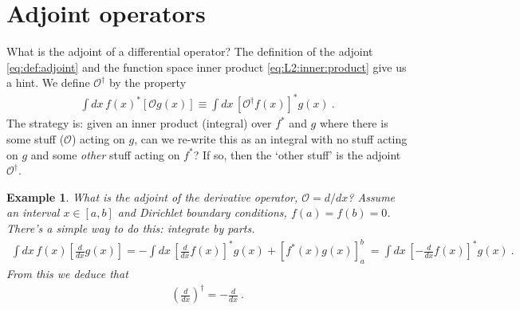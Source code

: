 \documentclass[
  11pt,
	colorful,
	raggedright,
]{tufte-style-thesis-flip}
\newtheorem{example}{Example}[section]
\begin{document}
\section{Adjoint operators}

What is the adjoint of a differential operator? The definition of the adjoint \eqref{eq:def:adjoint} and the function space inner product \eqref{eq:L2:inner:product} give us a hint. We define $\mathcal O^\dag$ by the property
\begin{align}
  \int dx \, f(x)^* \left[\mathcal O g(x)\right]
  \equiv
  \int dx \, \left[\mathcal O^\dag f(x)\right]^*  g(x) \ .
\end{align}
The strategy is: given an inner product (integral) over $f^*$ and $g$ where there is some stuff ($\mathcal O$) acting on $g$, can we re-write this as an integral with no stuff acting on $g$ and some \emph{other} stuff acting on $f^*$? If so, then the `other stuff' is the adjoint $\mathcal O^\dag$.
\begin{example}
What is the adjoint of the derivative operator, $\mathcal O = d/dx$? Assume an interval $x\in[a,b]$ and Dirichlet boundary conditions, $f(a)=f(b)=0$. There's a simple way to do this: integrate by parts.
\begin{align}
  \int dx \,  f(x) \left[\frac{d}{dx} g(x)\right]
  =
  - \int dx \, \left[\frac{d}{dx}f(x)\right]^* g(x)
  +
  \left[f^*(x)g(x)\right]^b_a \ 
  =
  \int dx \, \left[-\frac{d}{dx}f(x)\right]^* g(x)
  \ . 
\end{align}
From this we deduce that
\begin{align}
  \left(\frac{d}{dx}\right)^\dag = -\frac{d}{dx} \ .
\end{align}
\end{example}
\end{document}
